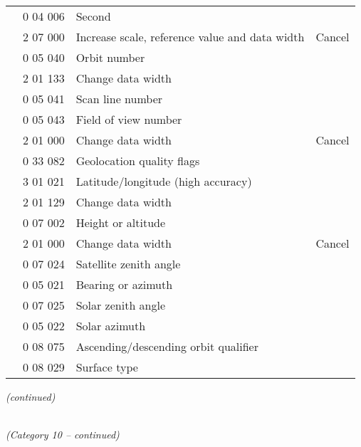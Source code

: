 \begin{longtable}[]{@{}llll@{}}
& 0 04 006 & Second &\tabularnewline
& 2 07 000 & Increase scale, reference value and data width & Cancel\tabularnewline
& 0 05 040 & Orbit number &\tabularnewline
& 2 01 133 & Change data width &\tabularnewline
& 0 05 041 & Scan line number &\tabularnewline
& 0 05 043 & Field of view number &\tabularnewline
& 2 01 000 & Change data width & Cancel\tabularnewline
& 0 33 082 & Geolocation quality flags &\tabularnewline
& 3 01 021 & Latitude/longitude (high accuracy) &\tabularnewline
& 2 01 129 & Change data width &\tabularnewline
& 0 07 002 & Height or altitude &\tabularnewline
& 2 01 000 & Change data width & Cancel\tabularnewline
& 0 07 024 & Satellite zenith angle &\tabularnewline
& 0 05 021 & Bearing or azimuth &\tabularnewline
& 0 07 025 & Solar zenith angle &\tabularnewline
& 0 05 022 & Solar azimuth &\tabularnewline
& 0 08 075 & Ascending/descending orbit qualifier &\tabularnewline
& 0 08 029 & Surface type &\tabularnewline
\bottomrule
\end{longtable}

\emph{(continued)}

\emph{\\
(Category 10 -- continued)}

